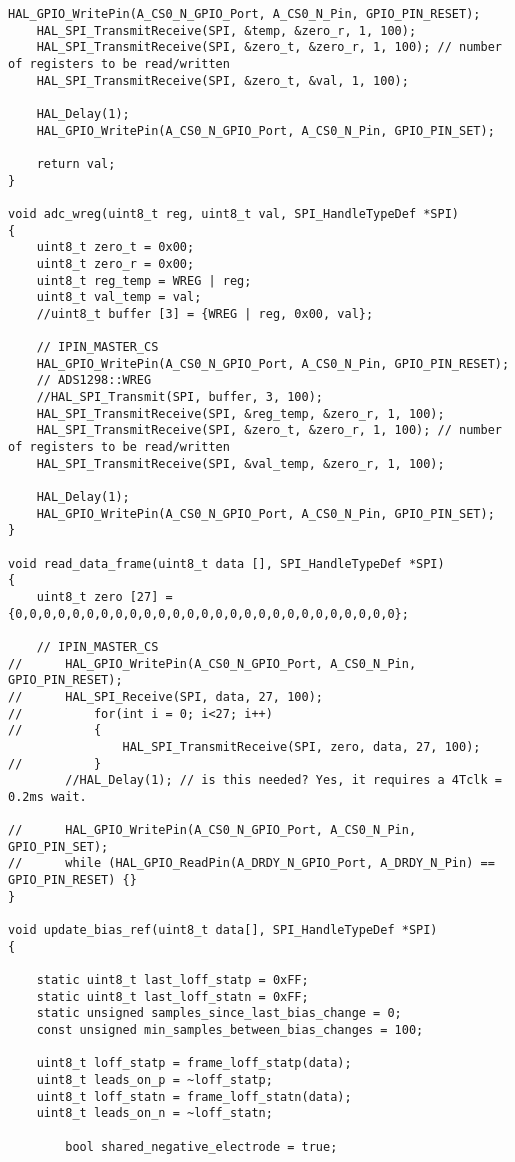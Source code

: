 \begin{lstlisting}[label=algoritmo:STM32F4:ADS1299.c,style = STM-code,frame=single,caption=STM32F4:ADS1299.c]
	HAL_GPIO_WritePin(A_CS0_N_GPIO_Port, A_CS0_N_Pin, GPIO_PIN_RESET);
	HAL_SPI_TransmitReceive(SPI, &temp, &zero_r, 1, 100);
	HAL_SPI_TransmitReceive(SPI, &zero_t, &zero_r, 1, 100);	// number of registers to be read/written
	HAL_SPI_TransmitReceive(SPI, &zero_t, &val, 1, 100);

	HAL_Delay(1);
	HAL_GPIO_WritePin(A_CS0_N_GPIO_Port, A_CS0_N_Pin, GPIO_PIN_SET);

	return val;
}

void adc_wreg(uint8_t reg, uint8_t val, SPI_HandleTypeDef *SPI)
{
	uint8_t zero_t = 0x00;
	uint8_t zero_r = 0x00;
	uint8_t reg_temp = WREG | reg;
	uint8_t val_temp = val;
	//uint8_t buffer [3] = {WREG | reg, 0x00, val};
	
	// IPIN_MASTER_CS
	HAL_GPIO_WritePin(A_CS0_N_GPIO_Port, A_CS0_N_Pin, GPIO_PIN_RESET);
	// ADS1298::WREG
	//HAL_SPI_Transmit(SPI, buffer, 3, 100);
	HAL_SPI_TransmitReceive(SPI, &reg_temp, &zero_r, 1, 100);
	HAL_SPI_TransmitReceive(SPI, &zero_t, &zero_r, 1, 100);	// number of registers to be read/written
	HAL_SPI_TransmitReceive(SPI, &val_temp, &zero_r, 1, 100);	

	HAL_Delay(1);
	HAL_GPIO_WritePin(A_CS0_N_GPIO_Port, A_CS0_N_Pin, GPIO_PIN_SET);
}

void read_data_frame(uint8_t data [], SPI_HandleTypeDef *SPI)
{
	uint8_t zero [27] = {0,0,0,0,0,0,0,0,0,0,0,0,0,0,0,0,0,0,0,0,0,0,0,0,0,0,0};
	
	// IPIN_MASTER_CS	
//		HAL_GPIO_WritePin(A_CS0_N_GPIO_Port, A_CS0_N_Pin, GPIO_PIN_RESET);
//		HAL_SPI_Receive(SPI, data, 27, 100);
//			for(int i = 0; i<27; i++)
//			{
				HAL_SPI_TransmitReceive(SPI, zero, data, 27, 100);
//			}
		//HAL_Delay(1);	// is this needed? Yes, it requires a 4Tclk = 0.2ms wait.
	
//		HAL_GPIO_WritePin(A_CS0_N_GPIO_Port, A_CS0_N_Pin, GPIO_PIN_SET);
//		while (HAL_GPIO_ReadPin(A_DRDY_N_GPIO_Port, A_DRDY_N_Pin) == GPIO_PIN_RESET) {}
}

void update_bias_ref(uint8_t data[], SPI_HandleTypeDef *SPI)
{

	static uint8_t last_loff_statp = 0xFF;
	static uint8_t last_loff_statn = 0xFF;
	static unsigned samples_since_last_bias_change = 0;
	const unsigned min_samples_between_bias_changes = 100;

	uint8_t loff_statp = frame_loff_statp(data);
	uint8_t leads_on_p = ~loff_statp;
	uint8_t loff_statn = frame_loff_statn(data);
	uint8_t leads_on_n = ~loff_statn;

		bool shared_negative_electrode = true;
	

\end{lstlisting}
